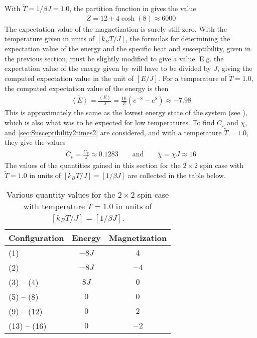 With $\tilde{T} = 1/\beta J = 1.0$, the partition function in  gives the value
\begin{align}
	Z = 12+4\cosh(8) \approx 6000
\end{align}
The expectation value of the magnetization is surely still zero.
With the temperature given in units of $[k_B T/J]$, the formulas for determining the expectation value of the energy and the specific heat and susceptibility, given in the previous section, must be slightly modified to give a value.
E.g. the expectation value of the energy given by  will have to be divided by $J$, giving the computed expectation value in the unit of $[E/J]$. 
For a temperature of $\tilde{T} = 1.0$, the computed expectation value of the energy is then
\begin{align}
	\tilde{\left< E \right>} 
	= \frac{\left< E \right>}{J}	
	= \frac{16}{Z} (e^{-8}-e^{8}) \approx -7.98 
\end{align} 
This is approximately the same as the lowest energy state of the system (see ), which is also what was to be expected for low temperatures. 
To find $C_v$ and $\chi$,  and \eqref{sec:Susceptibility2times2} are considered, and with a temperature $\tilde{T}  = 1.0$, they give the values
\begin{align*}
	\tilde{C}_v = \frac{C_v}{J}
	\approx 0.1283
	\qquad \text{and} \qquad
	\tilde{\chi} = \chi J \approx 16
\end{align*}
The values of the quantities gained in this section for the $2\times 2$ spin case with $\tilde{T} = 1.0$ in units of $[k_B T/J] = [1/\beta J]$ are collected in the table below.
\begin{table}[H]
\centering
\caption{Various quantity values for the $2\times 2$ spin case with temperature $\tilde{T} = 1.0$ in units of $[k_B T/J] = [1/\beta J]$.}
\begin{center}
\begin{tabular}{ |l | c | c | }
  \hline			
  Configuration & Energy & Magnetization  \\
  \hline
  (1) & $-8J$ & $4$ \\
  \hline
  (2) & $-8J$ & $-4$ \\
  \hline
  (3) -- (4) & $8J$ & $0$ \\
  \hline
  (5) -- (8) & $0$ & $0$ \\
  \hline
  (9) -- (12) & $0$ & $2$ \\
  \hline
  (13) -- (16) & $0$ & $-2$ \\
  \hline
\end{tabular}
\end{center}
\label{tab:ClosedFormSolution2times2T1}
\end{table}